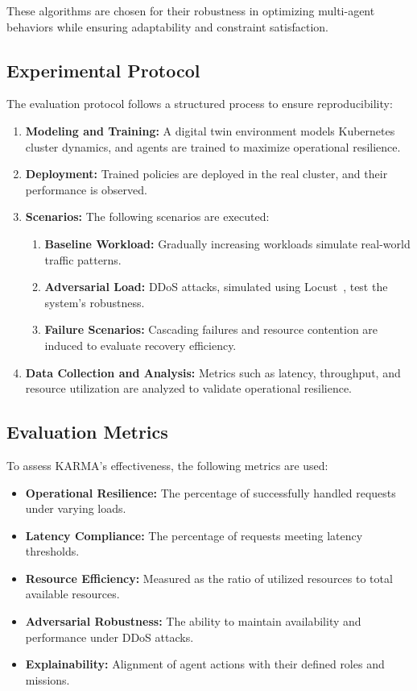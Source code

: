 \documentclass[conference]{IEEEtran}
\begin{document}
These algorithms are chosen for their robustness in optimizing multi-agent behaviors while ensuring adaptability and constraint satisfaction.

\subsection{Experimental Protocol}

The evaluation protocol follows a structured process to ensure reproducibility:
\begin{enumerate}
    \item \textbf{Modeling and Training:} A digital twin environment models Kubernetes cluster dynamics, and agents are trained to maximize operational resilience.
    \item \textbf{Deployment:} Trained policies are deployed in the real cluster, and their performance is observed.
    \item \textbf{Scenarios:} The following scenarios are executed:
    \begin{enumerate}
        \item \textbf{Baseline Workload:} Gradually increasing workloads simulate real-world traffic patterns.
        \item \textbf{Adversarial Load:} DDoS attacks, simulated using Locust~\cite{locust2021}, test the system's robustness.
        \item \textbf{Failure Scenarios:} Cascading failures and resource contention are induced to evaluate recovery efficiency.
    \end{enumerate}
    \item \textbf{Data Collection and Analysis:} Metrics such as latency, throughput, and resource utilization are analyzed to validate operational resilience.
\end{enumerate}

\subsection{Evaluation Metrics}

To assess KARMA's effectiveness, the following metrics are used:
\begin{itemize}
    \item \textbf{Operational Resilience:} The percentage of successfully handled requests under varying loads.
    \item \textbf{Latency Compliance:} The percentage of requests meeting latency thresholds.
    \item \textbf{Resource Efficiency:} Measured as the ratio of utilized resources to total available resources.
    \item \textbf{Adversarial Robustness:} The ability to maintain availability and performance under DDoS attacks.
    \item \textbf{Explainability:} Alignment of agent actions with their defined roles and missions.
\end{itemize}
\end{document}
